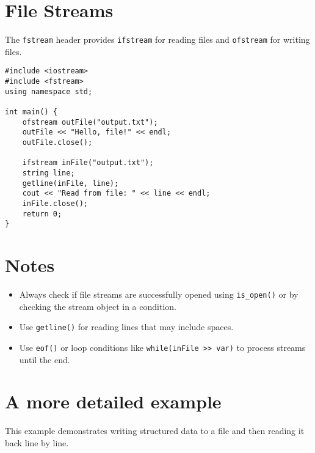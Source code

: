 \documentclass{article}
\begin{document}
\section{File Streams}

The \texttt{fstream} header provides \texttt{ifstream} for reading files and \texttt{ofstream} for writing files.

\begin{lstlisting}[style=cppstyle]
#include <iostream>
#include <fstream>
using namespace std;

int main() {
    ofstream outFile("output.txt");
    outFile << "Hello, file!" << endl;
    outFile.close();

    ifstream inFile("output.txt");
    string line;
    getline(inFile, line);
    cout << "Read from file: " << line << endl;
    inFile.close();
    return 0;
}
\end{lstlisting}

\section{Notes}
\begin{itemize}
  \item Always check if file streams are successfully opened using \texttt{is\_open()} or by checking the stream object in a condition.
  \item Use \texttt{getline()} for reading lines that may include spaces.
  \item Use \texttt{eof()} or loop conditions like \texttt{while(inFile >> var)} to process streams until the end.
\end{itemize}

\section{A more detailed example}
This example demonstrates writing structured data to a file and then reading it back line by line.
\end{document}
